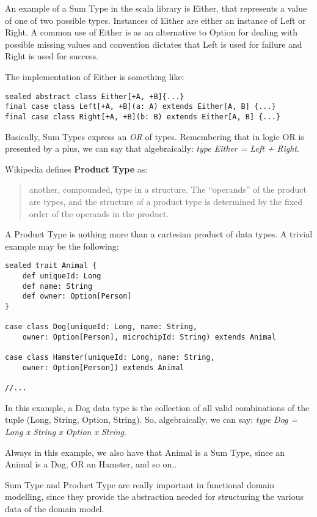 An example of a Sum Type in the scala library is Either, that represents
a value of one of two possible types. Instances of Either are either an
instance of Left or Right. A common use of Either is as an alternative
to Option for dealing with possible missing values and convention
dictates that Left is used for failure and Right is used for success.

The implementation of Either is something like:

\begin{verbatim}
sealed abstract class Either[+A, +B]{...}
final case class Left[+A, +B](a: A) extends Either[A, B] {...}
final case class Right[+A, +B](b: B) extends Either[A, B] {...}
\end{verbatim}

Basically, Sum Types express an \emph{OR} of types. Remembering that in
logic OR is presented by a plus, we can say that algebraically:
\emph{type Either = Left + Right}.

Wikipedia defines \textbf{Product Type} as:

\begin{quote}
another, compounded, type in a structure. The ``operands'' of the
product are types, and the structure of a product type is determined by
the fixed order of the operands in the product.
\end{quote}

A Product Type is nothing more than a cartesian product of data types. A
trivial example may be the following:

\begin{verbatim}
sealed trait Animal {
    def uniqueId: Long
    def name: String
    def owner: Option[Person]
}

case class Dog(uniqueId: Long, name: String,
    owner: Option[Person], microchipId: String) extends Animal

case class Hamster(uniqueId: Long, name: String,
    owner: Option[Person]) extends Animal

//...
\end{verbatim}

In this example, a Dog data type is the collection of all valid
combinations of the tuple (Long, String, Option, String). So,
algebraically, we can say: \emph{type Dog = Long x String x Option x
String}.

Always in this example, we also have that Animal is a Sum Type, since an
Animal is a Dog, OR an Hamster, and so on..

Sum Type and Product Type are really important in functional domain
modelling, since they provide the abstraction needed for structuring the
various data of the domain model.

